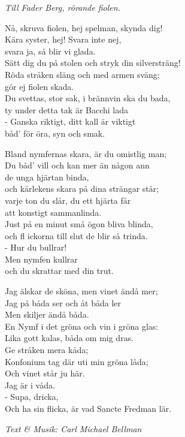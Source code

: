 {\footnotesize\textit{Till Fader Berg, rörande fiolen.}}\par
\vspace{10pt}
Nå, skruva fiolen, hej spelman, skynda dig!\\
Kära syster, hej! Svara inte nej,\\
svara ja, så blir vi glada.\\
Sätt dig du på stolen och stryk din silversträng!\\
Röda stråken släng och med armen sväng;\\
gör ej fiolen skada.\\
Du svettas, stor sak, i brännvin ska du bada,\\
ty under detta tak är Bacchi lada\\
- Ganska riktigt, ditt kall är viktigt\\
båd' för öra, syn och smak.\par
\vspace{10pt}
Bland nymfernas skara, är du omistlig man;\\
Du båd’ vill och kan mer än någon ann\\
de unga hjärtan binda,\\
och kärlekens skara på dina strängar står;\\
varje ton du slår, du ett hjärta får\\
att konstigt sammanlinda.\\
Just på en minut små ögon bliva blinda,\\
och fl ickorna till slut de blir så trinda.\\
- Hur du bullrar!\\
Men nymfen kullrar\\
och du skrattar med din trut.\par
\newpage
Jag älskar de sköna, men vinet ändå mer;\\
Jag på båda ser och åt båda ler\\
Men skiljer ändå båda.\\
En Nymf i det gröna och vin i gröna glas:\\
Lika gott kalas, båda om mig dras.\\
Ge stråken mera kåda;\\
Konfonium tag där uti min gröna låda;\\
Och vinet står ju här.\\
Jag är i våda.\\
- Supa, dricka,\\
Och ha sin flicka, är vad Sancte Fredman lär.\par
\vspace{10pt}
{\footnotesize\textit{Text & Musik: Carl Michael Bellman}}
